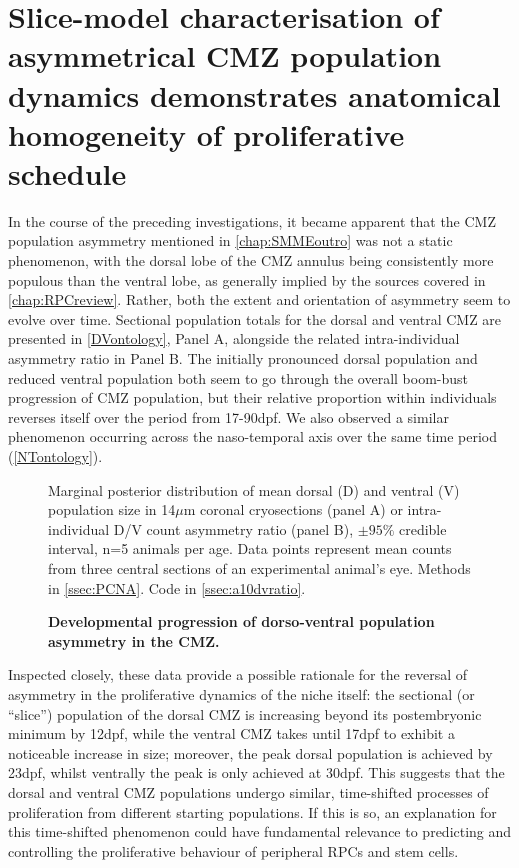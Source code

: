 \FloatBarrier

\section{Slice-model characterisation of asymmetrical CMZ population dynamics demonstrates anatomical homogeneity of proliferative schedule}
\label{sec:sliceGMC}

In the course of the preceding investigations, it became apparent that the CMZ population asymmetry mentioned in \autoref{chap:SMMEoutro} was not a static phenomenon, with the dorsal lobe of the CMZ annulus being consistently more populous than the ventral lobe, as generally implied by the sources covered in \autoref{chap:RPCreview}. Rather, both the extent and orientation of asymmetry seem to evolve over time. Sectional population totals for the dorsal and ventral CMZ are presented in \autoref{DVontology}, Panel A, alongside the related intra-individual asymmetry ratio in Panel B. The initially pronounced dorsal population and reduced ventral population both seem to go through the overall boom-bust progression of CMZ population, but their relative proportion within individuals reverses itself over the period from 17-90dpf. We also observed a similar phenomenon occurring across the naso-temporal axis over the same time period (\autoref{NTontology}).

\begin{figure}[!h]
    \caption{{\bf Developmental progression of dorso-ventral population asymmetry in the CMZ.}}
    Marginal posterior distribution of mean dorsal (D) and ventral (V) population size in 14$\mu$m coronal cryosections (panel A) or intra-individual D/V count asymmetry ratio (panel B), $\pm 95\%$ credible interval, n=5 animals per age. Data points represent mean counts from three central sections of an experimental animal's eye. 
    \label{DVontology}
    Methods in \autoref{ssec:PCNA}.
    Code in \autoref{ssec:a10dvratio}. 
\end{figure}

Inspected closely, these data provide a possible rationale for the reversal of asymmetry in the proliferative dynamics of the niche itself: the sectional (or ``slice'') population of the dorsal CMZ is increasing beyond its postembryonic minimum by 12dpf, while the ventral CMZ takes until 17dpf to exhibit a noticeable increase in size; moreover, the peak dorsal population is achieved by 23dpf, whilst ventrally the peak is only achieved at 30dpf. This suggests that the dorsal and ventral CMZ populations undergo similar, time-shifted processes of proliferation from different starting populations. If this is so, an explanation for this time-shifted phenomenon could have fundamental relevance to predicting and controlling the proliferative behaviour of peripheral RPCs and stem cells.

